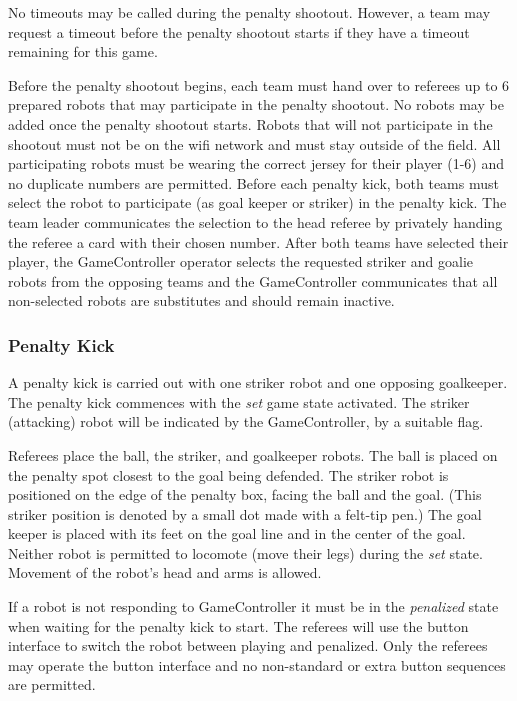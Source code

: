 No timeouts may be called during the penalty shootout. However, a team may request a timeout before the penalty shootout starts if they have a timeout remaining for this game. 

Before the penalty shootout begins, each team must hand over to referees up to 6 prepared robots that may participate in the penalty shootout. No robots may be added once the penalty shootout starts. Robots that will not participate in the shootout must not be on the wifi network and must stay outside of the field. All participating robots must be wearing the correct jersey for their player (1-6) and no duplicate numbers are permitted. Before each penalty kick, both teams must select the robot to participate (as goal keeper or striker) in the penalty kick. The team leader communicates the selection to the head referee by privately handing the referee a card with their chosen number. After both teams have selected their player, the GameController operator selects the requested striker and goalie robots from the opposing teams and the GameController communicates that all non-selected robots are substitutes and should remain inactive.

\subsubsection{Penalty Kick}
\label{sec:penalty_kick}

A penalty kick is carried out with one striker robot and one opposing goalkeeper.
The penalty kick commences with the \textit{set} game state activated.
The striker (attacking) robot will be indicated by the GameController, by a suitable flag.

Referees place the ball, the striker, and goalkeeper robots. The ball is placed on the penalty spot closest to the goal being defended. The striker robot is positioned on the edge of the penalty box, facing the ball and the goal. (This striker position is denoted by a small dot made with a felt-tip pen.) The goal keeper is placed with its feet on the goal line and in the center of the goal.
Neither robot is permitted to locomote (move their legs) during the \textit{set} state. Movement of the robot's head and arms is allowed.

If a robot is not responding to GameController it must be in the \emph{penalized} state when waiting for the penalty kick to start.
The referees will use the button interface to switch the robot between playing and penalized.
Only the referees may operate the button interface and no non-standard or extra button sequences are permitted.

